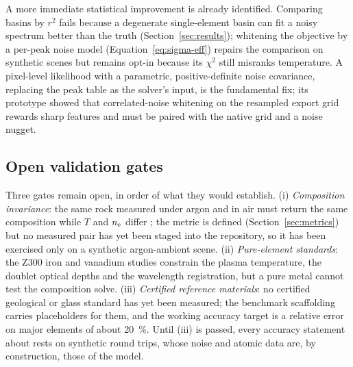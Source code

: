 A more immediate statistical improvement is already identified. Comparing basins by
$r^2$ fails because a degenerate single-element basin can fit a noisy spectrum
better than the truth (Section~\ref{sec:results}); whitening the objective by a
per-peak noise model (Equation~\eqref{eq:sigma-eff}) repairs the comparison on
synthetic scenes but remains opt-in because its $\chi^2$ still misranks
temperature. A pixel-level likelihood with a parametric, positive-definite noise
covariance, replacing the peak table as the solver's input, is the fundamental fix;
its prototype showed that correlated-noise whitening on the resampled export grid
rewards sharp features and must be paired with the native grid and a noise nugget.

\subsection{Open validation gates}

Three gates remain open, in order of what they would establish. (i)
\emph{Composition invariance}: the same rock measured under argon and in air must
return the same composition while $T$ and $n_{\mathrm{e}}$ differ \citep{palasti2022argon};
the metric is defined (Section~\ref{sec:metrics}) but no measured pair has yet been
staged into the repository, so it has been exercised only on a synthetic argon-ambient
scene. (ii) \emph{Pure-element standards}: the Z300 iron and vanadium studies
constrain the plasma temperature, the doublet optical depths and the wavelength
registration, but a pure metal cannot test the composition solve. (iii)
\emph{Certified reference materials}: no certified geological or glass standard
\citep{jochum2005georem,jochum2011nist} has yet been measured; the benchmark
scaffolding carries placeholders for them, and the working accuracy target is a
relative error on major elements of about \SI{20}{\percent}.
Until (iii) is passed, every accuracy statement about \alibz{} rests on synthetic
round trips, whose noise and atomic data are, by construction, those of the model.
